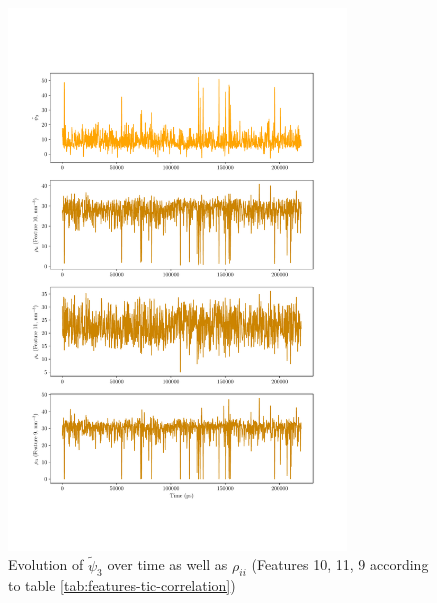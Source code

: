 \begin{spacing}{2.0}
    \begin{figure}[t]
        \centering
        \includegraphics[width=0.8\textwidth]{./figs/fig3-03}
        \caption{Evolution of $\tilde{\psi}_3$ over time as well as $\rho_{ii}$ (Features 10, 11, 9 according to table \ref{tab:features-tic-correlation})}
        \label{fig:time-correlation-psi3}
    \end{figure}


\end{spacing}
